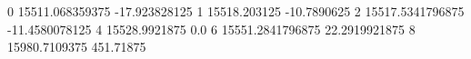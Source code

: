 0 15511.068359375 -17.923828125
1 15518.203125 -10.7890625
2 15517.5341796875 -11.4580078125
4 15528.9921875 0.0
6 15551.2841796875 22.2919921875
8 15980.7109375 451.71875
